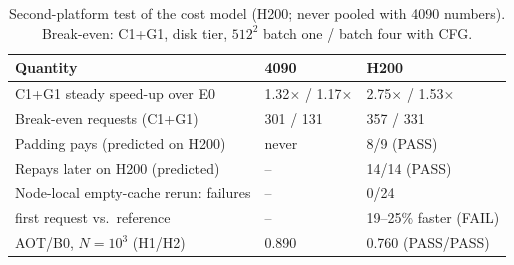 \documentclass[conference]{IEEEtran}
\newcommand{\tn}[1]{#1}%
\begin{document}
\begin{table}[t]
\caption{Second-platform test of the cost model (H200; never pooled with 4090 numbers). Break-even: C1+G1, disk tier, $512^2$ batch one / batch four with CFG.}
\label{tab:h200}
\centering\footnotesize
\setlength{\tabcolsep}{3pt}
\begin{tabularx}{\columnwidth}{@{}Yll@{}}
\toprule
Quantity & 4090 & H200\\
\midrule
C1+G1 steady speed-up over E0 & \tn{1.32}$\times$ / \tn{1.17}$\times$ & \tn{2.75}$\times$ / \tn{1.53}$\times$\\
Break-even requests (C1+G1) & \tn{301} / \tn{131} & \tn{357} / \tn{331}\\
Padding pays (predicted on H200) & never & \tn{8/9} (PASS)\\
Repays later on H200 (predicted) & -- & \tn{14/14} (PASS)\\
Node-local empty-cache rerun: failures & -- & \tn{0/24}\\
\quad first request vs.\ reference & -- & \tn{19--25\%} faster (FAIL)\\
AOT/B0, $N{=}10^3$ (H1/H2) & \tn{0.890} & \tn{0.760} (PASS/PASS)\\
\bottomrule
\end{tabularx}
\end{table}
\end{document}

